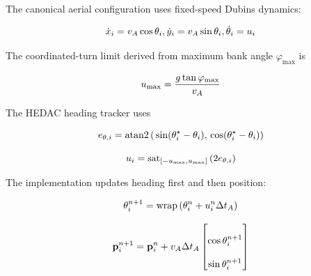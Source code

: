 \documentclass[11pt]{article}
\begin{document}
The canonical aerial configuration uses fixed-speed Dubins dynamics:


\begin{equation}
\dot x_i=v_A\cos\theta_i, \\
\qquad \\
\dot y_i=v_A\sin\theta_i, \\
\qquad \\
\dot\theta_i=u_i
\end{equation}


The coordinated-turn limit derived from maximum bank angle $\varphi_{\max}$ is


\begin{equation}
u_{\max} \\
= \\
\frac{g\tan\varphi_{\max}}{v_A}
\end{equation}


The HEDAC heading tracker uses


\begin{equation}
e_{\theta,i} \\
= \\
\mathrm{atan2} \\
\left( \\
\sin(\theta_i^\star-\theta_i), \\
\cos(\theta_i^\star-\theta_i) \\
\right)
\end{equation}


\begin{equation}
u_i \\
= \\
\mathrm{sat}_{[-u_{\max},u_{\max}]} \\
\left(2e_{\theta,i}\right)
\end{equation}


The implementation updates heading first and then position:


\begin{equation}
\theta_i^{n+1} \\
= \\
\mathrm{wrap} \\
\left(\theta_i^n+u_i^n\Delta t_A\right)
\end{equation}


\begin{equation}
\mathbf p_i^{n+1} \\
= \\
\mathbf p_i^n \\
+ \\
v_A\Delta t_A \\
\begin{bmatrix} \\
\cos\theta_i^{n+1}\\ \\
\sin\theta_i^{n+1} \\
\end{bmatrix}
\end{equation}
\end{document}
